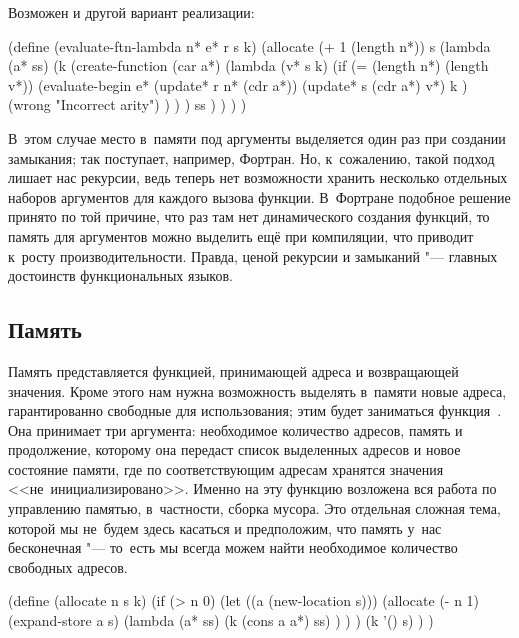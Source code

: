 Возможен и другой вариант реализации:

\begin{code:lisp}
(define (evaluate-ftn-lambda n* e* r s k)
  (allocate (+ 1 (length n*)) s
    (lambda (a* ss)
      (k (create-function
          (car a*)
          (lambda (v* s k)
            (if (= (length n*) (length v*))
                (evaluate-begin e*
                                (update* r n* (cdr a*))
                                (update* s (cdr a*) v*)
                                k )
                (wrong "Incorrect arity") ) ) )
      ss ) ) ) )
\end{code:lisp}

\noindent
В~этом случае место в~памяти под аргументы выделяется один раз при создании
замыкания; так поступает, например, Фортран. Но, к~сожалению, такой подход
лишает нас рекурсии, ведь теперь нет возможности хранить несколько отдельных
наборов аргументов для каждого вызова функции. В~Фортране подобное решение
принято по той причине, что раз там нет динамического создания функций, то
память для аргументов можно выделить ещё при компиляции, что приводит к~росту
производительности. Правда, ценой рекурсии и замыканий "--- главных достоинств
функциональных языков.


\subsection{Память}\label{assignment/implementation/ssect:memory}

Память представляется функцией, принимающей адреса и возвращающей значения.
Кроме этого нам нужна возможность выделять в~памяти новые адреса, гарантированно
свободные для использования; этим будет заниматься функция~. Она
принимает три аргумента: необходимое количество адресов, память и продолжение,
которому она передаст список выделенных адресов и новое состояние памяти, где по
соответствующим адресам хранятся значения <<не~инициализировано>>. Именно на эту
функцию возложена вся работа по управлению памятью, в~частности, сборка мусора.
Это отдельная сложная тема, которой мы
не~будем здесь касаться и предположим, что память у~нас бесконечная "---
то~есть мы всегда можем найти необходимое количество свободных адресов.

\begin{code:lisp}
(define (allocate n s k)
  (if (> n 0)
      (let ((a (new-location s)))
        (allocate (- n 1)
                  (expand-store a s)
                  (lambda (a* ss)
                    (k (cons a a*) ss) ) ) )
      (k '() s) ) )
\end{code:lisp}

